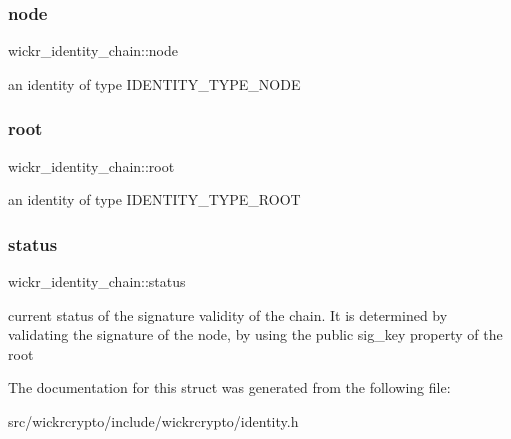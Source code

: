 \subsubsection{\texorpdfstring{node}{node}}
{\footnotesize\ttfamily wickr\+\_\+identity\+\_\+chain\+::node}

an identity of type \textquotesingle{}I\+D\+E\+N\+T\+I\+T\+Y\+\_\+\+T\+Y\+P\+E\+\_\+\+N\+O\+DE\textquotesingle{} \mbox{\label{structwickr__identity__chain_a0982b1510591138e2e7d0546741bc6e0}} 
\subsubsection{\texorpdfstring{root}{root}}
{\footnotesize\ttfamily wickr\+\_\+identity\+\_\+chain\+::root}

an identity of type \textquotesingle{}I\+D\+E\+N\+T\+I\+T\+Y\+\_\+\+T\+Y\+P\+E\+\_\+\+R\+O\+OT\textquotesingle{} \mbox{\label{structwickr__identity__chain_acee365b411eb4a7e7c68c115d60e166e}} 
\subsubsection{\texorpdfstring{status}{status}}
{\footnotesize\ttfamily wickr\+\_\+identity\+\_\+chain\+::status}

current status of the signature validity of the chain. It is determined by validating the signature of the node, by using the public \textquotesingle{}sig\+\_\+key\textquotesingle{} property of the root 

The documentation for this struct was generated from the following file\+:\begin{DoxyCompactItemize}
\item 
src/wickrcrypto/include/wickrcrypto/identity.\+h\end{DoxyCompactItemize}
